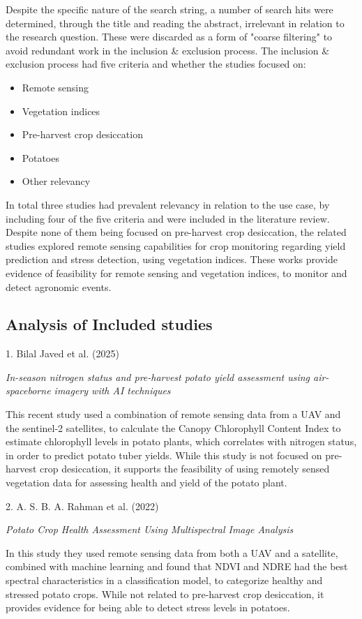 Despite the specific nature of the search string, a number of search hits were determined, through the title and reading the abstract, irrelevant in relation to the research question. These were discarded as a form of "coarse filtering" to avoid redundant work in the inclusion \& exclusion process. The inclusion \& exclusion process had five criteria and whether the studies focused on:
\begin{itemize}
    \item Remote sensing
    \item Vegetation indices
    \item Pre-harvest crop desiccation
    \item Potatoes
    \item Other relevancy
\end{itemize}
In total three studies had prevalent relevancy in relation to the use case, by including four of the five criteria and were included in the literature review. Despite none of them being focused on pre-harvest crop desiccation, the related studies explored remote sensing capabilities for crop monitoring regarding yield prediction and stress detection, using vegetation indices. These works provide evidence of feasibility for remote sensing and vegetation indices, to monitor and detect agronomic events.

\subsection{Analysis of Included studies}
1. Bilal Javed et al. (2025)

\textit{In-season nitrogen status and pre-harvest potato yield assessment using air-spaceborne imagery with AI techniques}

This recent study used a combination of remote sensing data from a UAV and the sentinel-2 satellites, to calculate the Canopy Chlorophyll Content Index to estimate chlorophyll levels in potato plants, which correlates with nitrogen status, in order to predict potato tuber yields\cite{javed2025inseason}. While this study is not focused on pre-harvest crop desiccation, it supports the feasibility of using remotely sensed vegetation data for assessing health and yield of the potato plant.

2. A. S. B. A. Rahman et al. (2022)

\textit{Potato Crop Health Assessment Using Multispectral Image Analysis}

In this study they used remote sensing data from both a UAV and a satellite, combined with machine learning and found that NDVI and NDRE had the best spectral characteristics in a classification model, to categorize healthy and stressed potato crops\cite{rahman2022potato}. While not related to pre-harvest crop desiccation, it provides evidence for being able to detect stress levels in potatoes.

